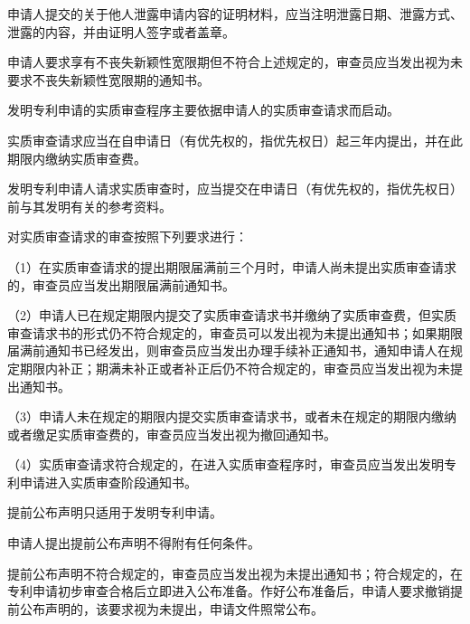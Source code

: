 申请人提交的关于他人泄露申请内容的证明材料，应当注明泄露日期、泄露方式、泄露的内容，并由证明人签字或者盖章。

申请人要求享有不丧失新颖性宽限期但不符合上述规定的，审查员应当发出视为未要求不丧失新颖性宽限期的通知书。

发明专利申请的实质审查程序主要依据申请人的实质审查请求而启动。

实质审查请求应当在自申请日（有优先权的，指优先权日）起三年内提出，并在此期限内缴纳实质审查费。

发明专利申请人请求实质审查时，应当提交在申请日（有优先权的，指优先权日）前与其发明有关的参考资料。

对实质审查请求的审查按照下列要求进行：

{\setlength{\parindent}{17.1bp}（1）在实质审查请求的提出期限届满前三个月时，申请人尚未提出实质审查请求的，审查员应当发出期限届满前通知书。\par}

{\setlength{\parindent}{17.1bp}（2）申请人已在规定期限内提交了实质审查请求书并缴纳了实质审查费，但实质审查请求书的形式仍不符合规定的，审查员可以发出视为未提出通知书；如果期限届满前通知书已经发出，则审查员应当发出办理手续补正通知书，通知申请人在规定期限内补正；期满未补正或者补正后仍不符合规定的，审查员应当发出视为未提出通知书。\par}

{\setlength{\parindent}{17.1bp}（3）申请人未在规定的期限内提交实质审查请求书，或者未在规定的期限内缴纳或者缴足实质审查费的，审查员应当发出视为撤回通知书。\par}

{\setlength{\parindent}{17.1bp}（4）实质审查请求符合规定的，在进入实质审查程序时，审查员应当发出发明专利申请进入实质审查阶段通知书。\par}

提前公布声明只适用于发明专利申请。

申请人提出提前公布声明不得附有任何条件。

提前公布声明不符合规定的，审查员应当发出视为未提出通知书；符合规定的，在专利申请初步审查合格后立即进入公布准备。作好公布准备后，申请人要求撤销提前公布声明的，该要求视为未提出，申请文件照常公布。

